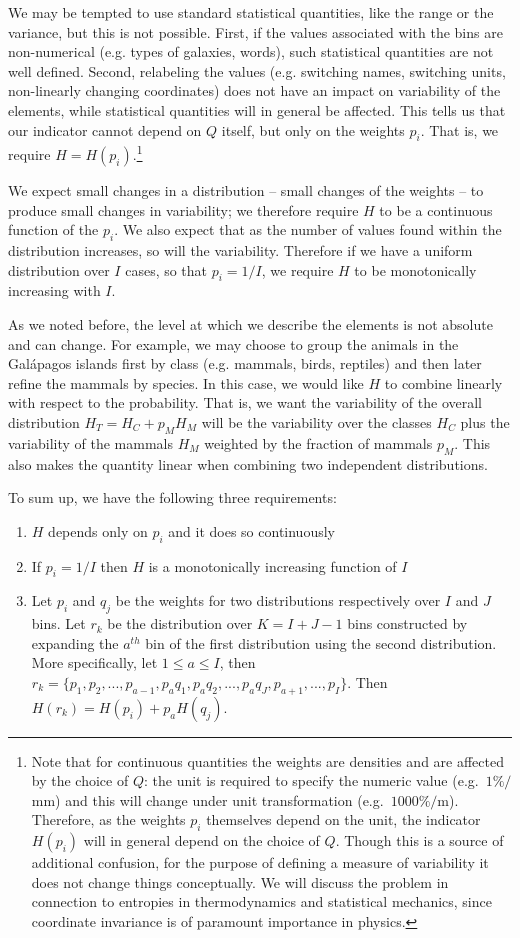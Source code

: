 \documentclass{article}
\begin{document}
We may be tempted to use standard statistical quantities, like the range or the variance, but this is not possible. First, if the values associated with the bins are non-numerical (e.g. types of galaxies, words), such statistical quantities are not well defined. Second, relabeling the values (e.g. switching names, switching units, non-linearly changing coordinates) does not have an impact on variability of the elements, while statistical quantities will in general be affected. This tells us that our indicator cannot depend on $Q$ itself, but only on the weights $p_i$. That is, we require $H=H(p_i)$.\footnote{Note that for continuous quantities the weights are densities and are affected by the choice of $Q$: the unit is required to specify the numeric value (e.g.~$1 \% / $mm) and this will change under unit transformation (e.g.~$1000 \% /$m). Therefore, as the weights $p_i$ themselves depend on the unit, the indicator $H(p_i)$ will in general depend on the choice of $Q$. Though this is a source of additional confusion, for the purpose of defining a measure of variability it does not change things conceptually. We will discuss the problem in connection to entropies in thermodynamics and statistical mechanics, since coordinate invariance is of paramount importance in physics.}

We  expect small changes in a distribution -- small changes of the weights -- to produce small changes in variability; we therefore require $H$ to be a continuous function of the $p_i$. We also expect that as the number of values found within the distribution increases, so will the variability. Therefore if we have a uniform distribution over $I$ cases, so that $p_i = 1/I$, we require $H$ to be monotonically increasing with $I$.

As we noted before, the level at which we describe the elements is not absolute and can change. For example, we may choose to group the animals in the Gal\'{a}pagos islands first by class (e.g. mammals, birds, reptiles) and then later refine the mammals by species. In this case, we would like $H$ to combine linearly with respect to the probability. That is, we want the variability of the overall distribution $H_T = H_C + p_M H_M$ will be the variability over the classes $H_C$ plus the variability of the mammals $H_M$ weighted by the fraction of mammals $p_M$. This also makes the quantity linear when combining two independent distributions.

To sum up, we have the following three requirements:
\begin{enumerate}
\item $H$ depends only on $p_i$ and it does so continuously
\item If $p_i=1/I$ then $H$ is a monotonically increasing function of $I$
\item Let $p_i$ and $q_j$ be the weights for two distributions respectively over $I$ and $J$ bins. Let $r_k$ be the distribution over $K=I+J-1$ bins constructed by expanding the $a^{th}$ bin of the first distribution using the second distribution. More specifically, let $1 \leq a \leq I$, then $r_k = \{p_1, p_2, ..., p_{a-1}, p_{a}q_1, p_{a}q_2, ..., p_{a}q_J, p_{a+1}, ..., p_I \}$. Then $H(r_k) = H(p_i) + p_{a} H(q_j)$.
\end{enumerate}
\end{document}
